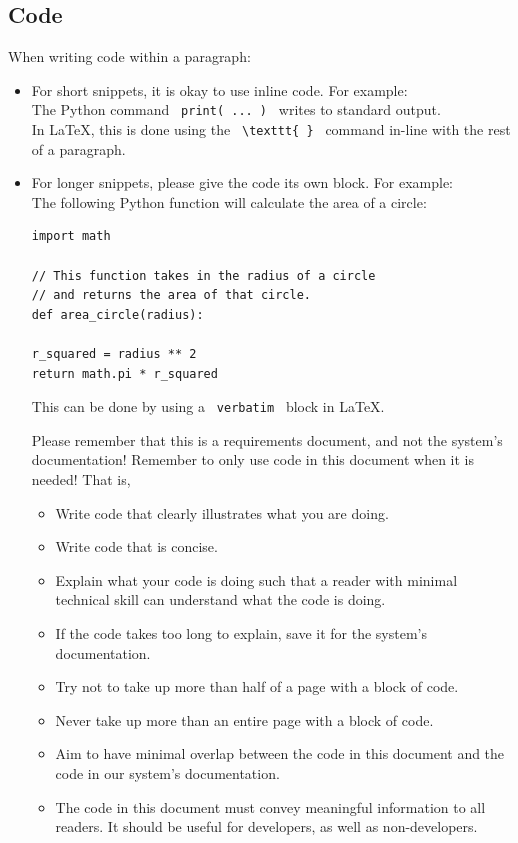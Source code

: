 \documentclass{scrreprt}
\begin{document}
\subsection{Code}
When writing code within a paragraph:
\begin{itemize}
\item For short snippets, it is okay to use inline code. For example: \\
The Python command \texttt{ print( ... ) } writes to standard output. \\
In LaTeX, this is done using the \texttt{ \textbackslash texttt\{ \} } command in-line with the rest of a paragraph.
\item For longer snippets, please give the code its own block. For example: \\
The following Python function will calculate the area of a circle: \\
\begin {verbatim}
import math

// This function takes in the radius of a circle
// and returns the area of that circle.
def area_circle(radius):

r_squared = radius ** 2
return math.pi * r_squared
\end{verbatim}
This can be done by using a \texttt{ verbatim } block in LaTeX.  

Please remember that this is a requirements document, and not the system's documentation!
Remember to only use code in this document when it is needed!
That is,
\begin{itemize}
    \item Write code that clearly illustrates what you are doing.
    \item Write code that is concise.
    \item Explain what your code is doing such that a reader with minimal technical skill can understand what the code is doing.
    \item If the code takes too long to explain, save it for the system's documentation.
    \item Try not to take up more than half of a page with a block of code.
    \item Never take up more than an entire page with a block of code.
    \item Aim to have minimal overlap between the code in this document and the code in our system's documentation.
    \item The code in this document must convey meaningful information to all readers.
          It should be useful for developers, as well as non-developers.
\end{itemize}
\end{itemize}
$ $
\end{document}
